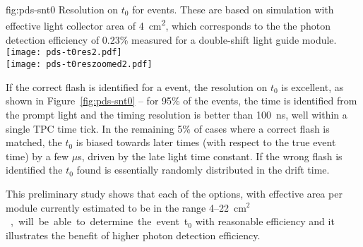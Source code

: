 \begin{dunefigure}{fig:pds-snt0}
{Resolution on $t_0$ for  events. These are based on simulation with effective light collector area of \SI{4}{cm^2}, which corresponds to the the photon detection efficiency of 0.23\% measured for a double-shift light guide module.}
  \texttt{[image: pds-t0res2.pdf]}\\
  \texttt{[image: pds-t0reszoomed2.pdf]}
\end{dunefigure}

If the correct flash is identified for a  event, the resolution on $t_0$ is excellent, as shown in Figure~\ref{fig:pds-snt0} -- for 95\% of the events, the time is identified from the prompt light and the timing resolution is better than \SI{100}{ns}, well within a single TPC time tick. In the remaining 5\% of cases where a correct flash is matched, the $t_0$ is biased towards later times (with respect to the true event time) by a few $\mu$s, driven by the late light time constant. If the wrong flash is identified the $t_0$ found is essentially randomly distributed in the drift time.

This preliminary study shows that each of the  options, with effective area per module currently estimated to be in the range  \num{4}--\SI{22}{cm$^2$}, will be able to determine the event t$_0$ with reasonable efficiency and it illustrates the benefit of higher photon detection efficiency. 


